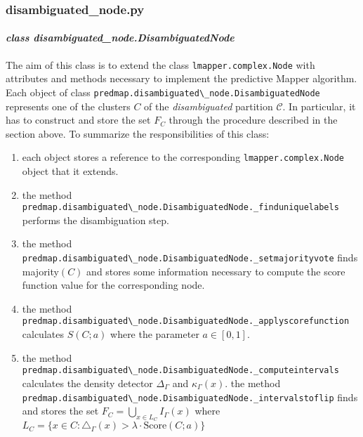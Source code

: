 \subsubsection{disambiguated\_node.py}
\paragraph{\textit{class disambiguated\_node.DisambiguatedNode}}

The aim of this class is to extend the class \lstinline|lmapper.complex.Node| with attributes and methods necessary to implement the predictive Mapper algorithm. Each object of class \lstinline|predmap.disambiguated\_node.DisambiguatedNode| represents one of the clusters $C$ of the \textit{disambiguated} partition $\mathcal C$. In particular, it has to construct and store the set $F_C$ through the procedure described in the section above. To summarize the responsibilities of this class:
\begin{enumerate}
	\item each object stores a reference to the corresponding \lstinline|lmapper.complex.Node| object that it extends.
	\item the method \lstinline|predmap.disambiguated\_node.DisambiguatedNode._finduniquelabels| performs the disambiguation step.
	\item the method \lstinline|predmap.disambiguated\_node.DisambiguatedNode._setmajorityvote| finds majority$(C)$ and stores some information
	necessary to compute the score function value for the corresponding node.
	\item the method \lstinline|predmap.disambiguated\_node.DisambiguatedNode._applyscorefunction| calculates $S(C; a)$ where the parameter $a\in[0,1]$.
	\item the method \lstinline|predmap.disambiguated\_node.DisambiguatedNode._computeintervals| calculates the density detector $\Delta_\Gamma$ and $\kappa_\Gamma(x)$.
	the method \lstinline|predmap.disambiguated\_node.DisambiguatedNode._intervalstoflip| finds and stores the set $F_C=\bigcup_{x\in L_C} I_\Gamma(x)$ where $L_C = \{x\in C: \triangle_\Gamma(x)>\lambda\cdot \text{Score}(C;a)\}$
\end{enumerate}
